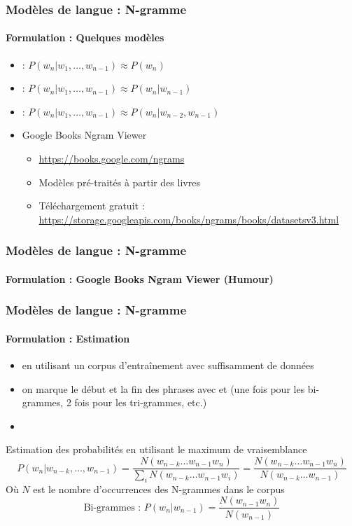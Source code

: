 \documentclass[xcolor=table]{beamer}
\begin{document}
\begin{frame}
\frametitle{Modèles de langue : N-gramme}
\framesubtitle{Formulation : Quelques modèles}

\begin{itemize}
	\item {} : $P(w_n | w_1,\ldots, w_{n-1}) \approx P(w_n)$
	\item {} : $P(w_n | w_1,\ldots, w_{n-1}) \approx P(w_n | w_{n-1})$
	\item {} :  $P(w_n | w_1,\ldots, w_{n-1}) \approx P(w_n | w_{n-2}, w_{n-1})$
	\item Google Books Ngram Viewer
	\begin{itemize}
		\item \url{https://books.google.com/ngrams}
		\item Modèles pré-traités à partir des livres 
		\item Téléchargement gratuit : \url{https://storage.googleapis.com/books/ngrams/books/datasetsv3.html}
	\end{itemize}
\end{itemize}

\end{frame}

\begin{frame}
\frametitle{Modèles de langue : N-gramme}
\framesubtitle{Formulation : Google Books Ngram Viewer (Humour)}


\end{frame}

\begin{frame}
\frametitle{Modèles de langue : N-gramme}
\framesubtitle{Formulation : Estimation}

\begin{itemize}
	\item en utilisant un corpus d'entraînement avec suffisamment de données
	\item on marque le début et la fin des phrases avec  et  (une fois pour les bi-grammes, 2 fois pour les tri-grammes, etc.)
	\item {}
\end{itemize}

\begin{block}{Estimation des probabilités en utilisant le maximum de vraisemblance}
	\[%
	P(w_n | w_{n-k},\ldots, w_{n-1}) = \frac{N(w_{n-k} \ldots w_{n-1} w_n)}{\sum_i N(w_{n-k} \ldots w_{n-1} w_i)}
	= \frac{N(w_{n-k} \ldots w_{n-1} w_n)}{N(w_{n-k} \ldots w_{n-1})}
	\]
	Où $N$ est le nombre d'occurrences des N-grammes dans le corpus
	\[%
	\text{Bi-grammes : } P(w_n | w_{n-1}) = \frac{N(w_{n-1} w_n)}{N(w_{n-1})}
	\]
\end{block}

\end{frame}
\end{document}

